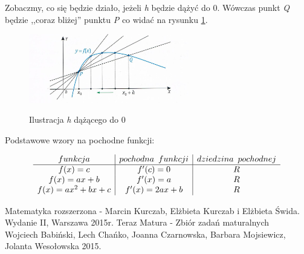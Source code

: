 \documentclass[12pt]{article}
\begin{document}
Zobaczmy, co się będzie działo, jeżeli \textit{h} będzie dążyć do 0. Wówczas punkt \textit{Q} będzie ,,coraz bliżej'' punktu \textit{P} co widać na rysunku \ref{rys2_model}. 
\begin{figure}[ht]
\begin{center}
\includegraphics[height=3cm]{zdj2.jpg}
\cite{pazdro}
\caption{Ilustracja \textit{h} dążącego do 0}
\label{rys2_model}
\end{center}
\end{figure}
\begin{center}
Podstawowe wzory na pochodne funkcji:
\end{center}
\[
\begin{array}{c|c|c}
funkcja & pochodna \hspace{5px} funkcji & dziedzina  \hspace{5px} pochodnej\\
\hline
f(x)=c & f'(c)= 0 & R \\
f(x) = ax + b & f'(x) = a & R\\
f(x) = ax^2 + bx + c & f'(x) = 2ax + b & R
\end{array}
\]

\newpage
\begin{thebibliography}{9}
Matematyka rozszerzona - Marcin Kurczab, Elżbieta Kurczab i Elżbieta Świda. Wydanie II, Warszawa 2015r.
Teraz Matura - Zbiór zadań maturalnych\\
Wojciech Babiński, Lech Chańko, Joanna Czarnowska, Barbara Mojsiewicz, Jolanta Wesołowska 2015.
\end{thebibliography}
\end{document}
